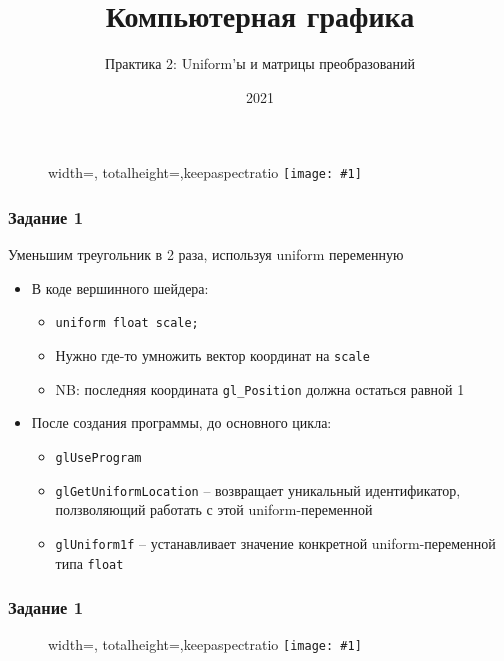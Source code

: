 \documentclass{beamer}
\title{Компьютерная графика}
\subtitle{Практика 2: Uniform'ы и матрицы преобразований}
\date{2021}
\newcommand{\slideimage}[1]{
  \begin{figure}
    \begin{adjustbox}{width=\textwidth, totalheight=\textheight-2\baselineskip-2\baselineskip,keepaspectratio}
      \texttt{[image: \#1]}
    \end{adjustbox}
  \end{figure}
}
\begin{document}
\frame{\titlepage}

\begin{frame}
\slideimage{0.png}
\end{frame}

\begin{frame}[fragile]
\frametitle{Задание 1}
Уменьшим треугольник в 2 раза, используя uniform переменную
\begin{itemize}
\pause
\item В коде вершинного шейдера:
\begin{itemize}
\item \verb|uniform float scale;|
\pause
\item Нужно где-то умножить вектор координат на \verb|scale|
\item NB: последняя координата \verb|gl_Position| должна остаться равной 1
\end{itemize}
\pause
\item После создания программы, до основного цикла:
\begin{itemize}
\item \verb|glUseProgram|
\item \verb|glGetUniformLocation| -- возвращает уникальный идентификатор, ползволяющий работать с этой uniform-переменной
\item \verb|glUniform1f| -- устанавливает значение конкретной uniform-переменной типа \verb|float|
\end{itemize}
\end{itemize}
\end{frame}

\begin{frame}
\frametitle{Задание 1}
\slideimage{1.png}
\end{frame}
\end{document}
